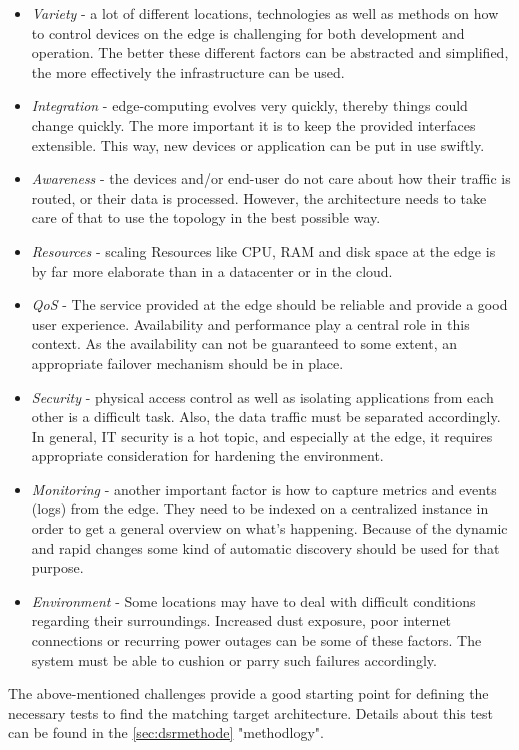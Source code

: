 \documentclass[MSC,Master,english]{twbook}%
\begin{document}
\begin{itemize}
    \item \textit{Variety} - a lot of different locations, technologies as well as methods on how to control devices on the edge is challenging for both development and operation. The better these different factors can be abstracted and simplified, the more effectively the infrastructure can be used.
    \item \textit{Integration} - edge-computing evolves very quickly, thereby things could change quickly. The more important it is to keep the provided interfaces extensible. This way, new devices or application can be put in use swiftly. 
    \item \textit{Awareness} - the devices and/or end-user do not care about how their traffic is routed, or their data is processed. However, the architecture needs to take care of that to use the topology in the best possible way.
    \item \textit{Resources} - scaling Resources like \ac{CPU}, \ac{RAM} and disk space at the edge is by far more elaborate than in a datacenter or in the cloud.
    \item \textit{\ac{QoS}} - The service provided at the edge should be reliable and provide a good user experience. Availability and performance play a central role in this context. As the availability can not be guaranteed to some extent, an appropriate failover mechanism should be in place.
    \item \textit{Security} - physical access control as well as isolating applications from each other is a difficult task. Also, the data traffic must be separated accordingly. In general, \ac{IT} security is a hot topic, and especially at the edge, it requires appropriate consideration for hardening the environment.
    \item \textit{Monitoring} - another important factor is how to capture metrics and events (logs) from the edge. They need to be indexed on a centralized instance in order to get a general overview on what's happening. Because of the dynamic and rapid changes some kind of automatic discovery should be used for that purpose.
    \item \textit{Environment} - Some locations may have to deal with difficult conditions regarding their surroundings. Increased dust exposure, poor internet connections or recurring power outages can be some of these factors. The system must be able to cushion or parry such failures accordingly.
\end{itemize}
The above-mentioned challenges provide a good starting point for defining the necessary tests to find the matching target architecture. Details about this test can be found in the \autoref{sec:dsrmethode} "methodlogy".
\end{document}
